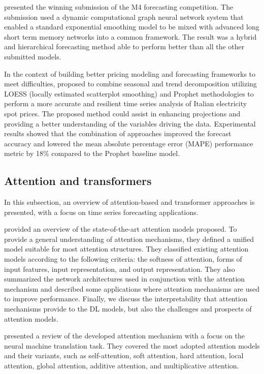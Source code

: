 \cite{SMYL202075} presented the winning submission of the M4 forecasting competition.
The submission used a dynamic computational graph neural network system that enabled a standard exponential smoothing model to be mixed with advanced long short term memory networks into a common framework.
The result was a hybrid and hierarchical forecasting method able to perform better than all the other submitted models.

In the context of building better pricing modeling and forecasting frameworks to meet difficulties, \cite{en16031371} proposed to combine seasonal and trend decomposition utilizing LOESS (locally estimated scatterplot smoothing) and Prophet methodologies to perform a more accurate and resilient time series analysis of Italian electricity spot prices.
The proposed method could assist in enhancing projections and providing a better understanding of the variables driving the data.
Experimental results showed that the combination of approaches improved the forecast accuracy and lowered the mean absolute percentage error (MAPE) performance metric by 18\% compared to the Prophet baseline model.


\vspace{0.1 cm}
\subsection{Attention and transformers}
\label{sec:transformers}
\vspace{0.1 cm}

In this subsection, an overview of attention-based and transformer approaches is presented, with a focus on time series forecasting applications.

\cite{NIU202148} provided an overview of the state-of-the-art attention models proposed.
To provide a general understanding of attention mechanisms, they defined a unified model suitable for most attention structures.
They classified existing attention models according to the following criteria: the softness of attention, forms of input features, input representation, and output representation.
They also summarized the network architectures used in conjunction with the attention mechanism and described some applications where attention mechanisms are used to improve performance.
Finally, we discuss the interpretability that attention mechanisms provide to the DL models, but also the challenges and prospects of attention models.

\cite{9586824} presented a review of the developed attention mechanism with a focus on the neural machine translation task.
They covered the most adopted attention models and their variants, such as self-attention, soft attention, hard attention, local attention, global attention, additive attention, and multiplicative attention.

